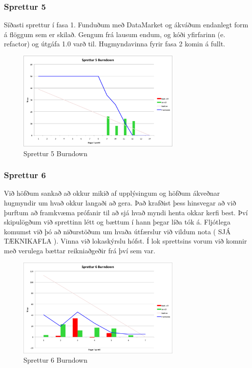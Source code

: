 \documentclass{article}
\begin{document}
\subsubsection{Sprettur 5}
Síðasti sprettur í fasa 1. Funduðum með DataMarket og ákváðum endanlegt form á
flöggum sem er skilað. Gengum frá lausum endum, og kóði yfirfarinn 
(e. refactor) og útgáfa 1.0 varð til. Hugmyndavinna fyrir fasa 2 komin á fullt.

\begin{figure}[H]
 \centering
 \includegraphics[width=0.72\textwidth]{Sprettur5_Burndown.png}
 \caption{Sprettur 5 Burndown}
\end{figure}

\subsubsection{Sprettur 6}
Við höfðum sankað að okkur mikið af upplýsingum og höfðum ákveðnar hugmyndir um
hvað okkur langaði að gera. Það krafðist þess hinsvegar að við 
þurftum að framkvæma prófanir til að sjá hvað myndi henta okkar kerfi best. Því
skipulögðum við sprettinn létt og bættum í hann þegar líða tók á. 
Fljótlega komumst við þó að niðurstöðum um hvaða útfærslur við vildum nota ( SJÁ
TÆKNIKAFLA ). Vinna við lokaskýrslu hófst. Í lok sprettsins 
vorum við komnir með verulega bættar reikniaðgeðir frá því sem var.

\begin{figure}[H]
 \centering
 \includegraphics[width=0.72\textwidth]{Sprettur6_Burndown.png}
 \caption{Sprettur 6 Burndown}
\end{figure}
\end{document}
